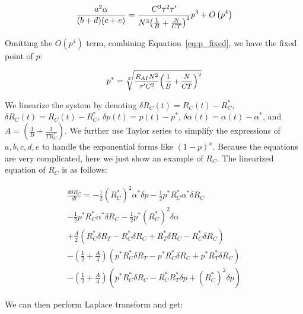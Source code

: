 \begin{equation}
\small
\frac{{{a^2}\alpha }}{{(b + d)(c + e)}} = \frac{{{C^3}{\tau ^2}\tau '}}{{{N^3}{{\left( {\frac{1}{B} + \frac{N}{{CT}}} \right)}^2}}}{p^3} + O\left( {{p^4}} \right)
\end{equation}

Omitting the $O(p^4)$ term, combining Equation~\ref{eq:p_fixed}, we have the fixed point of $p$:

\begin{equation}
\small
{p^*} = \sqrt[3]{{\frac{{{R_{AI}}{N^2}}}{{\tau '{C^2}}}{{\left( {\frac{1}{B} + \frac{N}{{CT}}} \right)}^2}}}
\end{equation}

We linearize the system by denoting $\delta {R_C}(t) = {R_C}(t) - R_C^*$, $\delta {R_C}(t) = {R_C}(t) - R_C^*$,
$\delta p(t) = p(t) - p^*$, $\delta \alpha (t) = \alpha (t) - \alpha^*$, and $A = \left( {\frac{1}{B} + \frac{1}{{TR_C^*}}} \right)$.
We further use Taylor series to simplify the expressions of $a, b, c, d, e$ to handle the exponential forms like $(1-p)^x$.
Because the equations are very complicated, here we just show an example of $R_C$. The linearized equation of $R_C$ is as follows:

\begin{equation}
\begin{array}{l}
\frac{{d\delta {R_C}}}{{dt}} =  - \frac{1}{2}{(R_C^*)^2}{\alpha ^*}\delta p - \frac{1}{2}{p^*}R_C^*{\alpha ^*}\delta R_C \\
 - \frac{1}{2}{p^*}R_C^*{\alpha ^*}\delta {R_C} - \frac{1}{2}{p^*}{(R_C^*)^2}\delta \alpha \\
 + \frac{A}{2}\left( {R_C^*\delta {R_T} - R_C^*\delta {R_C} + R_T^*\delta {R_C} - R_C^*\delta R_C} \right)\\
 - \left( {\frac{1}{2} + \frac{A}{4}} \right)\left( {{p^*}R_C^*\delta {R_T} - {p^*}R_C^*\delta {R_C} + {p^*}R_T^*\delta {R_C}} \right)\\ 
 - \left( {\frac{1}{2} + \frac{A}{4}} \right)\left( {{p^*}R_C^*\delta R_C - R_C^*R_T^*\delta p + {{(R_C^*)}^2}\delta p} \right)
\end{array}
\end{equation}

We can then perform Laplace transform and get:

